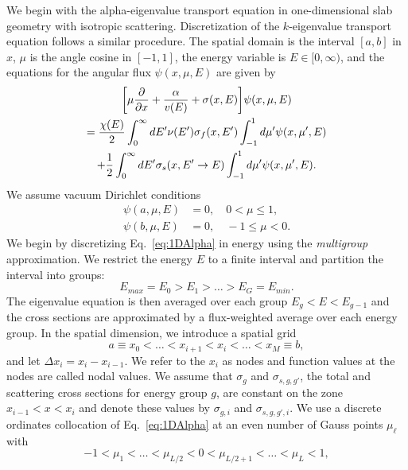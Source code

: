 We begin with the alpha-eigenvalue transport equation in one-dimensional slab geometry with isotropic scattering. Discretization of the $k$-eigenvalue transport equation follows a similar procedure. The spatial domain is the interval $[a,b]$ in $x$, $\mu$ is the angle cosine in $[-1,1]$, the energy variable is $E \in [0, \infty)$, and the equations for the angular flux $\psi(x, \mu, E)$ are given by
\begin{multline}
\bigg [ \mu \frac{\partial}{\partial x} + \frac{\alpha}{v(E)} + \sigma(x,E) \bigg ] \psi(x,\mu,E) \\ = \frac{\chi(E)}{2} \int_{0}^{\infty} \mathop{}\!d E' \nu(E') \sigma_{f}(x,E') \int_{-1}^{1} \mathop{}\!d \mu' \psi(x,\mu',E) \\ + \frac{1}{2} \int_{0}^{\infty} \mathop{}\!d E' \sigma_{s}(x, E' \rightarrow E) \int_{-1}^{1} \mathop{}\!d \mu' \psi(x,\mu',E).
\label{eq:1DAlpha}
\end{multline}
We assume vacuum Dirichlet conditions
\begin{align*}
	\psi(a, \mu, E) &=0, \quad 0 < \mu \leq 1, \\
        \psi(b, \mu, E) &=0, \quad -1 \leq \mu < 0.
\end{align*}
We begin by discretizing Eq.~\ref{eq:1DAlpha} in energy using the \textit{multigroup} approximation. We restrict the energy $E$ to a finite interval and partition the interval into groups:
\begin{equation*}
	E_{max} = E_{0} > E_{1} > \dots > E_{G} = E_{min}.
\end{equation*}
The eigenvalue equation is then averaged over each group $E_{g} < E < E_{g-1}$ and the cross sections are approximated by a flux-weighted average over each energy group. In the spatial dimension, we introduce a spatial grid
\begin{equation*}
	a \equiv x_{0} < \dots < x_{i+1} < x_{i} < \dots < x_{M} \equiv b,
\end{equation*}
and let $\Delta x_{i} = x_{i} - x_{i-1}$. We refer to the $x_{i}$ as nodes and function values at the nodes are called nodal values. We assume that $\sigma_{g}$ and $\sigma_{s,g,g'}$, the total and scattering cross sections for energy group $g$, are constant on the zone $x_{i-1} < x < x_{i}$ and denote these values by $\sigma_{g,i}$ and $\sigma_{s,g,g',i}$. We use a discrete ordinates collocation of Eq.~\ref{eq:1DAlpha} at an even number of Gauss points $\mu_{\ell}$ with
\begin{equation*}
	-1 < \mu_{1} < \dots < \mu_{L/2} < 0 < \mu_{L/2+1} < \dots < \mu_{L} < 1, 
\end{equation*}
